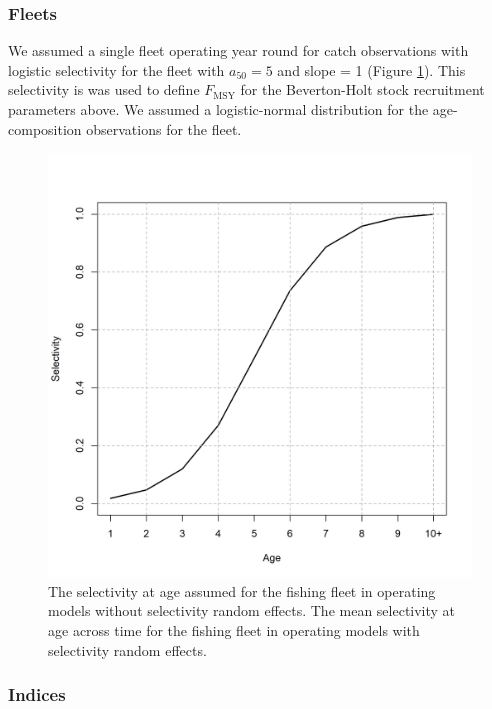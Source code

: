 \documentclass[
  12pt,
]{article}
\newcommand{\Fmsy}{\ensuremath{F_{\text{MSY}}}\xspace}
\begin{document}
\hypertarget{fleets}{%
\subsubsection*{Fleets}\label{fleets}}

We assumed a single fleet operating year round for catch observations
with logistic selectivity for the fleet with \(a_{50} = 5\) and slope =
1 (Figure \ref{om_mean_selectivity}). This selectivity is was used to
define \Fmsy for the Beverton-Holt stock recruitment parameters above.
We assumed a logistic-normal distribution for the age-composition
observations for the fleet.

\begin{figure}
\caption{The selectivity at age assumed for the fishing fleet in operating models without selectivity random effects. The mean selectivity at age across time for the fishing fleet in operating models with selectivity random effects.}\label{om_mean_selectivity}
\begin{center}
\includegraphics[width = \textwidth]{om_mean_selectivity.png}
\end{center}
\end{figure}

\hypertarget{indices}{%
\subsubsection*{Indices}\label{indices}}
\end{document}
